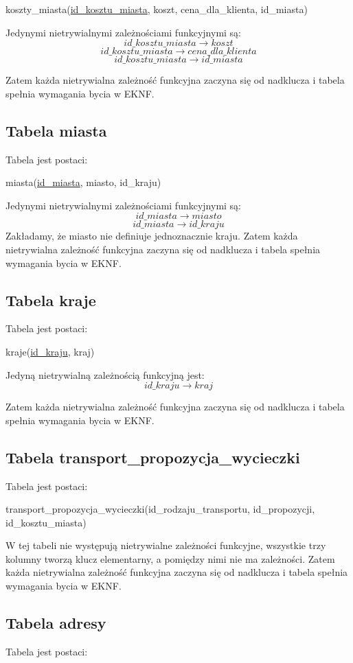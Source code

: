 \documentclass[a4paper,12pt]{mwart}
\begin{document}
koszty\_miasta(\underline{id\_kosztu\_miasta}, koszt, cena\_dla\_klienta, id\_miasta)

\noindent Jedynymi nietrywialnymi zależnościami funkcyjnymi są:
$$   id\_kosztu\_miasta  \rightarrow koszt $$
$$   id\_kosztu\_miasta  \rightarrow cena\_dla\_klienta $$
$$   id\_kosztu\_miasta  \rightarrow id\_miasta $$

Zatem każda nietrywialna zależność funkcyjna zaczyna się od nadklucza i tabela  spełnia wymagania bycia w EKNF.

\subsection{Tabela miasta}
Tabela jest postaci:

miasta(\underline{id\_miasta}, miasto, id\_kraju)

\noindent Jedynymi nietrywialnymi zależnościami funkcyjnymi są:
$$   id\_miasta  \rightarrow miasto $$
$$   id\_miasta  \rightarrow id\_kraju $$
Zakładamy, że miasto nie definiuje jednoznacznie kraju.
Zatem każda nietrywialna zależność funkcyjna zaczyna się od nadklucza i tabela  spełnia wymagania bycia w EKNF.

\subsection{Tabela kraje}
Tabela jest postaci:

kraje(\underline{id\_kraju}, kraj)

\noindent Jedyną nietrywialną zależnością funkcyjną jest:
$$   id\_kraju  \rightarrow kraj$$


Zatem każda nietrywialna zależność funkcyjna zaczyna się od nadklucza i tabela  spełnia wymagania bycia w EKNF.

\subsection{Tabela transport\_propozycja\_wycieczki}
Tabela jest postaci:

transport\_propozycja\_wycieczki(id\_rodzaju\_transportu, id\_propozycji, id\_kosztu\_miasta)

W tej tabeli nie występują nietrywialne zależności funkcyjne, wszystkie trzy kolumny tworzą klucz elementarny, a pomiędzy nimi nie ma zależności.
Zatem każda nietrywialna zależność funkcyjna zaczyna się od nadklucza i tabela  spełnia wymagania bycia w EKNF.

\subsection{Tabela adresy}
Tabela jest postaci:
\end{document}
